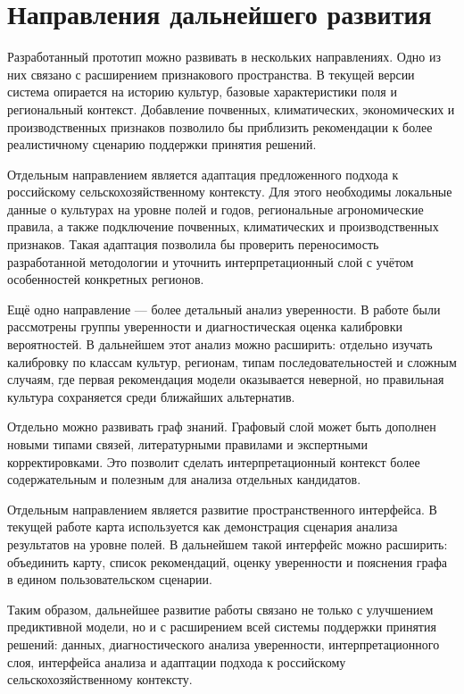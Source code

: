 \section{Направления дальнейшего развития}

Разработанный прототип можно развивать
в нескольких направлениях. Одно из них связано с расширением признакового
пространства. В текущей версии система опирается на историю культур, базовые характеристики поля и региональный контекст.
Добавление почвенных, климатических, экономических и производственных признаков позволило бы приблизить рекомендации к
более реалистичному сценарию поддержки принятия решений.

Отдельным направлением является адаптация предложенного подхода к российскому сельскохозяйственному контексту. Для
этого необходимы локальные данные о культурах на уровне полей и годов, региональные агрономические правила, а также
подключение почвенных, климатических и производственных признаков. Такая адаптация позволила бы проверить
переносимость разработанной методологии и уточнить интерпретационный слой с учётом особенностей конкретных регионов.

Ещё одно направление — более детальный анализ уверенности. В работе были рассмотрены группы уверенности и
диагностическая оценка калибровки вероятностей. В дальнейшем этот анализ можно расширить: отдельно изучать калибровку по
классам культур, регионам, типам последовательностей и сложным случаям, где первая рекомендация модели оказывается
неверной, но правильная культура сохраняется среди ближайших альтернатив.

Отдельно можно развивать граф знаний. Графовый слой может быть дополнен новыми типами связей,
литературными правилами и экспертными корректировками. Это позволит сделать интерпретационный контекст более содержательным
и полезным для анализа отдельных кандидатов.

Отдельным направлением является развитие пространственного интерфейса. В текущей работе карта используется как
демонстрация сценария анализа результатов на уровне полей. В дальнейшем такой интерфейс можно расширить: объединить карту,
список рекомендаций, оценку уверенности и пояснения графа в едином пользовательском сценарии.

Таким образом, дальнейшее развитие работы связано не только с улучшением предиктивной модели, но и с расширением всей
системы поддержки принятия решений: данных, диагностического анализа уверенности, интерпретационного слоя, интерфейса
анализа и адаптации подхода к российскому сельскохозяйственному контексту.
